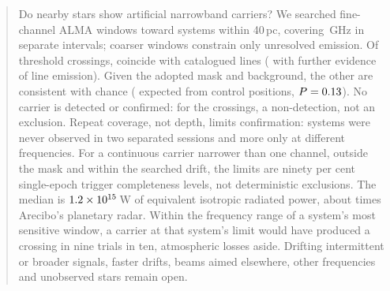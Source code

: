 \begin{abstract}
Do nearby stars show artificial narrowband carriers? We searched \NWinA{} fine-channel ALMA windows toward
\NSysClassA{} systems within 40\,pc, covering \CvUnionA\,GHz in
\CovNIslands{} separate intervals; \NWinB{} coarser windows constrain only unresolved
emission. Of \CsNCross{} threshold crossings, \MkNCoinc{}
coincide with catalogued lines (\LnAttrSupp{} with further
evidence of line emission). Given the adopted mask and background, the
other \CeObs{} are consistent with chance (\CeExp{} expected from control
positions, $P=\CeProbNull$). No carrier is detected or confirmed: for the
crossings, a non-detection, not an exclusion. Repeat coverage, not depth,
limits confirmation: \ZcNoRepNoSep{} systems were never observed in two separated
sessions and \ZcNoRepNoFreqWord{} more only at different frequencies. For a
continuous carrier narrower than one channel, outside the mask and within the
searched drift, the limits are ninety per cent single-epoch trigger
completeness levels, not deterministic exclusions. The median is
$\EirpNinetySysMedA$\,W of equivalent isotropic radiated power, about
\AroMedMult{} times Arecibo's planetary radar. Within the frequency range of
a system's most sensitive window, a carrier at that system's limit would have produced
a crossing in nine trials in ten, atmospheric losses aside. Drifting intermittent or broader signals, faster
drifts, beams aimed elsewhere, other frequencies and unobserved stars
remain open.
\end{abstract}


